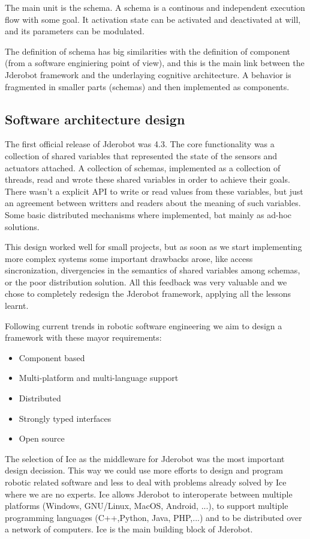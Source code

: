 \documentclass[twocolumn]{svjour3}          %
\begin{document}
The main unit is the schema. A schema is a continous and independent execution flow with some goal. It activation state can be activated and deactivated at will, and its parameters can be modulated.

The definition of schema has big similarities with the definition of component (from a software enginiering point of view), and this is the main link between the Jderobot framework and the underlaying cognitive architecture. A behavior is fragmented in smaller parts (schemas) and then implemented as components.

\subsection{Software architecture design}
The first official release of Jderobot was 4.3. The core functionality was a collection of shared variables that represented the state of the sensors and actuators attached. A collection of schemas, implemented as a collection of threads, read and wrote these shared variables in order to achieve their goals. There wasn't a explicit API to write or read values from these variables, but just an agreement between writters and readers about the meaning of such variables. Some basic distributed mechanisms where implemented, bat mainly as ad-hoc solutions.

This design worked well for small projects, but as soon as we start implementing more complex systems some important drawbacks arose, like access sincronization, divergencies in the semantics of shared variables among schemas, or the poor distribution solution. All this feedback was very valuable and we chose to completely redesign the Jderobot framework, applying all the lessons learnt.

Following current trends in robotic software engineering we aim to design a framework with these mayor requirements:
\begin{itemize}
\item Component based
\item Multi-platform and multi-language support
\item Distributed
\item Strongly typed interfaces
\item Open source
\end{itemize}

The selection of Ice as the middleware for Jderobot was the most important design decission. This way we could use more efforts to design and program robotic related software and less to deal with problems already solved by Ice where we are no experts. Ice allows Jderobot to interoperate between multiple platforms (Windows, GNU/Linux, MacOS, Android, ...), to support multiple programming languages (C++,Python, Java, PHP,...) and to be distributed over a network of computers. Ice is the main building block of Jderobot.
\end{document}
